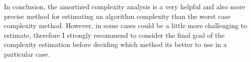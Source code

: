 \documentclass[12p]{report}
\begin{document}
In conclusion, the amortized complexity analysis is a very helpful and also more precise method for estimating an algorithm complexity than the worst case complexity method. However, in some cases could be a little more challenging to estimate,  therefore I strongly recommend to consider the final goal of the complexity estimation before deciding which method its better to use in a particular case.
\end{document}
